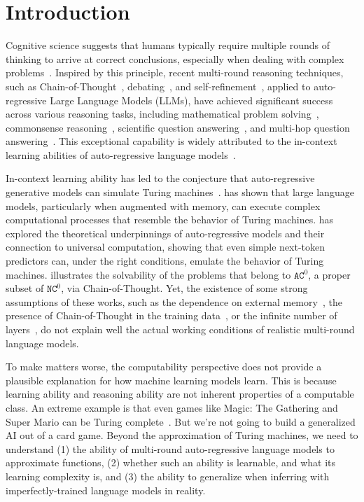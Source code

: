 \section{Introduction}

Cognitive science suggests that humans typically require multiple rounds of thinking to arrive at correct conclusions, especially when dealing with complex problems~\citep{nelson1990metamemory}. Inspired by this principle, recent multi-round reasoning techniques, such as Chain-of-Thought~\citep{wei2022chain}, debating~\citep{pmlr-v235-khan24a}, and self-refinement~\citep{madaan2024self,liu2024large}, applied to auto-regressive Large Language Models (LLMs), have achieved significant success across various reasoning tasks, including mathematical problem solving~\citep{cobbe2021training}, commonsense reasoning~\citep{talmor2019commonsenseqa}, scientific question answering~\citep{clark2018think}, and multi-hop question answering~\citep{yang2018hotpotqa}. This exceptional capability is widely attributed to the in-context learning abilities of auto-regressive language models~\citep{li2024dissecting,yang2024context}.

In-context learning ability has led to the conjecture that auto-regressive generative models can simulate Turing machines~\citep{lichain,merrill2024the}. \citet{schuurmans2023memory} has shown that large language models, particularly when augmented with memory, can execute complex computational processes that resemble the behavior of Turing machines. \citet{pmlr-v235-malach24a} has explored the theoretical underpinnings of auto-regressive models and their connection to universal computation, showing that even simple next-token predictors can, under the right conditions, emulate the behavior of Turing machines. \citet{lichain} illustrates the solvability of the problems that belong to $\texttt{AC}^0$, a proper subset of $\texttt{NC}^0$, via Chain-of-Thought. Yet, %
the existence of some strong assumptions of these works, such as the dependence on external memory~\citep{schuurmans2023memory}, the presence of Chain-of-Thought in the training data~\citep{pmlr-v235-malach24a}, or the infinite number of layers~\citep{yuntransformers}, do not explain well the actual working conditions of realistic multi-round language models.

To make matters worse, the computability perspective does not provide a plausible explanation for how machine learning models learn. This is because learning ability and reasoning ability are not inherent properties of a computable class. An extreme example is that even games like Magic: The Gathering and Super Mario can be Turing complete~\citep{churchill2020magic}. %
But we're not going to build a generalized AI out of a card game. Beyond the approximation of Turing machines, we need to understand (1) the ability of multi-round auto-regressive language models to approximate functions, (2) whether such an ability is learnable, and what its learning complexity is, and (3) the ability to generalize when inferring with imperfectly-trained language models in reality.

